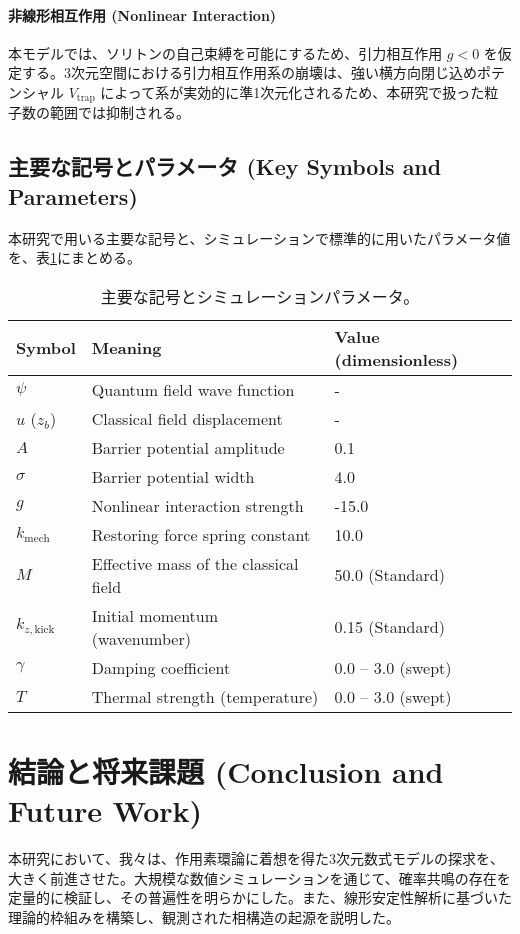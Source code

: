 \documentclass[a4paper,11pt,ja=standard,lualatex]{bxjsarticle}
\begin{document}
\paragraph{非線形相互作用 (Nonlinear Interaction)}
本モデルでは、ソリトンの自己束縛を可能にするため、引力相互作用 $g < 0$ を仮定する。3次元空間における引力相互作用系の崩壊は、強い横方向閉じ込めポテンシャル $V_{\text{trap}}$ によって系が実効的に準1次元化されるため、本研究で扱った粒子数の範囲では抑制される。

\subsection{主要な記号とパラメータ (Key Symbols and Parameters)}
本研究で用いる主要な記号と、シミュレーションで標準的に用いたパラメータ値を、表\ref{tab:params}にまとめる。

\begin{table}[h!]
\centering
\caption{主要な記号とシミュレーションパラメータ。}
\begin{tabular}{l l l}
\hline
\textbf{Symbol} & \textbf{Meaning} & \textbf{Value (dimensionless)} \\
\hline
$\psi$ & Quantum field wave function & - \\
$u$ ($z_b$) & Classical field displacement & - \\
$A$ & Barrier potential amplitude & 0.1 \\
$\sigma$ & Barrier potential width & 4.0 \\
$g$ & Nonlinear interaction strength & -15.0 \\
$k_{\text{mech}}$ & Restoring force spring constant & 10.0 \\
$M$ & Effective mass of the classical field & 50.0 (Standard) \\
$k_{z,\text{kick}}$ & Initial momentum (wavenumber) & 0.15 (Standard) \\
$\gamma$ & Damping coefficient & 0.0 -- 3.0 (swept) \\
$T$ & Thermal strength (temperature) & 0.0 -- 3.0 (swept) \\
\hline
\end{tabular}
\label{tab:params}
\end{table}

\FloatBarrier
\section{結論と将来課題 (Conclusion and Future Work)}
本研究において、我々は、作用素環論に着想を得た3次元数式モデルの探求を、大きく前進させた。大規模な数値シミュレーションを通じて、確率共鳴の存在を定量的に検証し、その普遍性を明らかにした。また、線形安定性解析に基づいた理論的枠組みを構築し、観測された相構造の起源を説明した。
\end{document}
